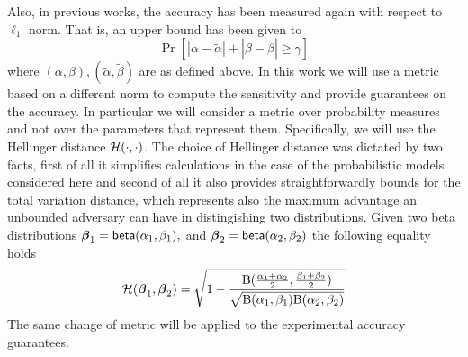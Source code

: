 \documentclass[sigconf, anonymous]{acmart}
\begin{document}
\noindent Also, in previous works, the accuracy has been measured again with respect to
$\ell_1$ norm. That is, an upper bound has been given to
\[
  \Pr[|\alpha - \tilde\alpha| + |\beta - \tilde\beta |\geq \gamma ]
\]
where $(\alpha, \beta), (\tilde\alpha,\tilde\beta)$ are as  defined above.
In this work we will use a metric based on a different norm to compute the sensitivity
and provide guarantees on the accuracy. In particular we will consider a metric
over probability measures and not over the parameters that represent them.
Specifically, we will use the Hellinger distance $\mathcal{H}(\cdot,\cdot)$.
The choice of Hellinger distance was dictated by two facts, first of all it simplifies
calculations in the case of the probabilistic models considered here
and second of all it also provides straightforwardly bounds for
the total variation distance, which represents also the maximum advantage
an unbounded adversary can have in distingishing two distributions. 
Given two beta distributions
$\boldsymbol{\beta}_1=\mathsf{beta}(\alpha_1, \beta_1),$ and $\boldsymbol{\beta}_2=\mathsf{beta}(\alpha_2, \beta_2)$ the following equality holds 
\[
  \mathcal{H}(\boldsymbol{\beta}_1, \boldsymbol{\beta}_2)=
  \sqrt{1 - \frac{\textup{B}(\frac{\alpha_1 + \alpha_2}{2}, \frac{\beta_1 + \beta_2}{2})}{\sqrt{\textup{B}(\alpha_1,\beta_1)\textup{B}(\alpha_2,\beta_2)}}}
\]
The same change of metric will be applied to the experimental accuracy guarantees.
\end{document}
